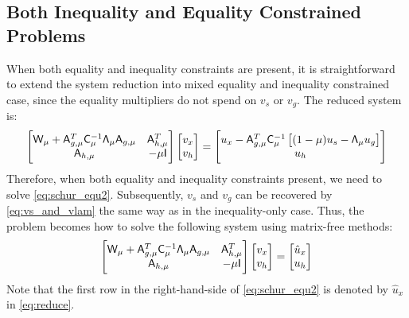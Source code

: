 \subsection{Both Inequality and Equality Constrained Problems}
When both equality and inequality constraints are present, it is straightforward 
to extend the system reduction into mixed equality and inequality 
constrained case, since the equality multipliers do not spend on $v_s$ or $v_g$. 
The reduced system is:
\begin{equation}\label{eq:schur_equ2}
\begin{bmatrix}
\mathsf{W}_\mu +  \mathsf{A}_{g,\mu}^T  \mathsf{C}_\mu^{-1} \mathsf{\Lambda}_\mu    \mathsf{A}_{g,\mu}    & \mathsf{A}_{h,\mu}^T   \\
\mathsf{A}_{h,\mu}  & -\mu \mathsf{I}
\end{bmatrix}
\begin{bmatrix} v_x \\ v_h  \end{bmatrix} 
=
\begin{bmatrix} u_x - \mathsf{A}_{g,\mu}^T \mathsf{C}_\mu^{-1}  \left[(1-\mu) u_s  - \mathsf{\Lambda}_\mu u_g     \right]  \\ u_h  \end{bmatrix} 
\end{equation}
Therefore, when both equality and inequality constraints present, we need to solve \eqref{eq:schur_equ2}. Subsequently,  $v_s$ and $v_g$ can be recovered by \eqref{eq:vs_and_vlam} the same way as in the inequality-only case. Thus, the problem becomes how to solve the following system using matrix-free methods: 
\begin{equation}\label{eq:reduce}
\begin{bmatrix}
\mathsf{W}_\mu +  \mathsf{A}_{g,\mu}^T  \mathsf{C}_\mu^{-1} \mathsf{\Lambda}_\mu  \mathsf{A}_{g,\mu}    & \mathsf{A}_{h,\mu}^T   \\
\mathsf{A}_{h,\mu}  & -\mu \mathsf{I}
\end{bmatrix}
\begin{bmatrix} v_x \\ v_h  \end{bmatrix} 
=
\begin{bmatrix} \hat{u}_x   \\ u_h  \end{bmatrix} 
\end{equation}
Note that the first row in the right-hand-side of \eqref{eq:schur_equ2} is denoted by $\hat{u}_x$ in \eqref{eq:reduce}.  

